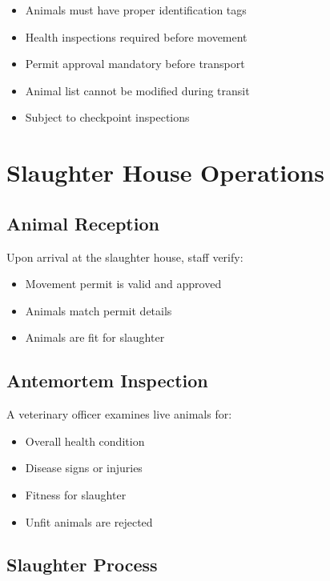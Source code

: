 \documentclass[11pt,a4paper]{article}
\begin{document}
\begin{itemize}[leftmargin=*]
    \item Animals must have proper identification tags
    \item Health inspections required before movement
    \item Permit approval mandatory before transport
    \item Animal list cannot be modified during transit
    \item Subject to checkpoint inspections
\end{itemize}

\section{Slaughter House Operations}

\subsection{Animal Reception}

Upon arrival at the slaughter house, staff verify:

\begin{itemize}[leftmargin=*]
    \item Movement permit is valid and approved
    \item Animals match permit details
    \item Animals are fit for slaughter
\end{itemize}

\subsection{Antemortem Inspection}

A veterinary officer examines live animals for:

\begin{itemize}[leftmargin=*]
    \item Overall health condition
    \item Disease signs or injuries
    \item Fitness for slaughter
    \item Unfit animals are rejected
\end{itemize}

\subsection{Slaughter Process}
\end{document}
